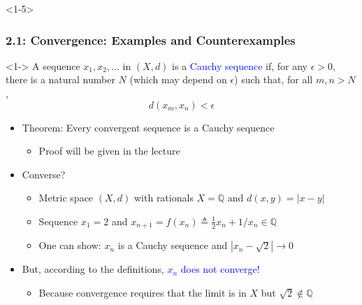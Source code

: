 \documentclass[10pt,english,aspectratio=169]{beamer}
\begin{document}
\begin{frame}<1-5> \frametitle{2.1: Convergence: Examples and Counterexamples}

\begin{definition}<1->
A sequence $x_1,x_2,\ldots$ in $(X,d)$ is a \textcolor{blue}{Cauchy sequence} if, for any $\epsilon >0$, there is a natural number $N$ (which may depend on $\epsilon$) such that, for all $m,n > N$,\vspace{-2mm}
\begin{equation*}
d \left( x_m, x_n \right) < \epsilon
\end{equation*}
\end{definition}

\begin{itemize}
\setlength\itemsep{3mm}
\item<2-> Theorem: Every convergent sequence is a Cauchy sequence \vspace{1mm}
\begin{itemize} 
  \setlength\itemsep{1.5mm}
  \item Proof will be given in the lecture \pause
\end{itemize}
\item<3-> Converse?  \vspace{1mm}
\begin{itemize} 
  \setlength\itemsep{1.5mm}
  \item<4-> Metric space $(X,d)$ with rationals $X=\mathbb{Q}$ and $d(x,y)=|x-y|$
  \item<4-> Sequence $x_1 = 2$ and $x_{n+1} = f(x_n) \triangleq \frac{1}{2} x_n + 1/x_n \in \mathbb{Q} $
  \item<4-> One can show: $x_n$ is a Cauchy sequence and $|x_n - \sqrt{2}|\to 0$
\end{itemize}
\item<5-> But, according to the definitions, \textcolor{blue}{$x_n$ does not converge!}  \vspace{1mm}
\begin{itemize} 
  \setlength\itemsep{1.5mm}
  \item Because convergence requires that the limit is in $X$ but $\sqrt{2} \notin \mathbb{Q}$
\end{itemize}
\end{itemize}


\end{frame}
\end{document}
